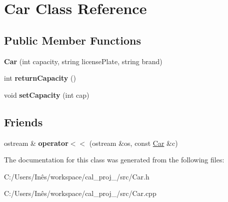 \hypertarget{class_car}{}\section{Car Class Reference}
\label{class_car}
\subsection*{Public Member Functions}
\begin{DoxyCompactItemize}
\item 
\hypertarget{class_car_adf1bf0f46fb3debe42a0ebe339694f94}{}{\bfseries Car} (int capacity, string license\+Plate, string brand)\label{class_car_adf1bf0f46fb3debe42a0ebe339694f94}

\item 
\hypertarget{class_car_a2deb075439fe60627ded29c35ec1d6c8}{}int {\bfseries return\+Capacity} ()\label{class_car_a2deb075439fe60627ded29c35ec1d6c8}

\item 
\hypertarget{class_car_ae6def8b680b4374df4ab04c145805bc5}{}void {\bfseries set\+Capacity} (int cap)\label{class_car_ae6def8b680b4374df4ab04c145805bc5}

\end{DoxyCompactItemize}
\subsection*{Friends}
\begin{DoxyCompactItemize}
\item 
\hypertarget{class_car_a257ed80570a174c7aaf65c9de8032326}{}ostream \& {\bfseries operator$<$$<$} (ostream \&os, const \hyperlink{class_car}{Car} \&c)\label{class_car_a257ed80570a174c7aaf65c9de8032326}

\end{DoxyCompactItemize}


The documentation for this class was generated from the following files\+:\begin{DoxyCompactItemize}
\item 
C\+:/\+Users/\+Inês/workspace/cal\+\_\+proj\+\_/src/Car.\+h\item 
C\+:/\+Users/\+Inês/workspace/cal\+\_\+proj\+\_/src/Car.\+cpp\end{DoxyCompactItemize}
